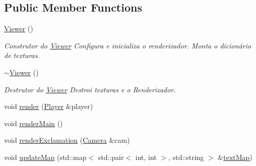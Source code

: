 \subsection*{Public Member Functions}
\begin{DoxyCompactItemize}
\item 
\hyperlink{classViewer_aaedebacb31cba87de6e7d448ed8d6586}{Viewer} ()
\begin{DoxyCompactList}\small\item\em Construtor do \hyperlink{classViewer}{Viewer} Configura e inicializa o renderizador. Monta o dicionário de texturas. \end{DoxyCompactList}\item 
\hyperlink{classViewer_a324e5a6a1532fe5eac3f3b0e4792b2da}{$\sim$\+Viewer} ()
\begin{DoxyCompactList}\small\item\em Destrutor do \hyperlink{classViewer}{Viewer} Destroi texturas e o Renderizador. \end{DoxyCompactList}\item 
void \hyperlink{classViewer_a335d914ec8088b5917df9ec465f7a7aa}{render} (\hyperlink{classPlayer}{Player} \&player)
\item 
void \hyperlink{classViewer_a2f6616a8c04e79b4251c7d1aaf1d3aaa}{render\+Main} ()
\item 
void \hyperlink{classViewer_abf19deab378a650856e92ab4f4e42126}{render\+Exclamation} (\hyperlink{classCamera}{Camera} \&cam)
\item 
void \hyperlink{classViewer_ab9787f02682d9e2b699ab16cd20fe43a}{update\+Map} (std\+::map$<$ std\+::pair$<$ int, int $>$, std\+::string $>$ \&\hyperlink{classViewer_a34e0e3043d5155be7fbaef0b07b647f8}{text\+Map})
\end{DoxyCompactItemize}
